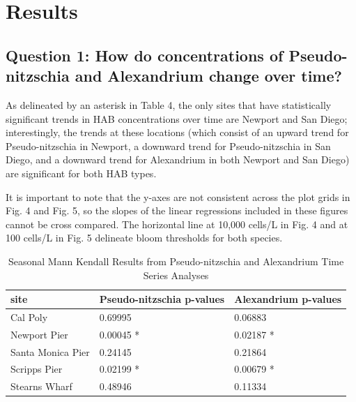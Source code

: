 \documentclass[
  12pt,
]{article}
\begin{document}
\newpage

\hypertarget{results}{%
\section{Results}\label{results}}

\hypertarget{question-1-how-do-concentrations-of-pseudo-nitzschia-and-alexandrium-change-over-time}{%
\subsection{Question 1: How do concentrations of Pseudo-nitzschia and
Alexandrium change over
time?}\label{question-1-how-do-concentrations-of-pseudo-nitzschia-and-alexandrium-change-over-time}}

As delineated by an asterisk in Table 4, the only sites that have
statistically significant trends in HAB concentrations over time are
Newport and San Diego; interestingly, the trends at these locations
(which consist of an upward trend for Pseudo-nitzschia in Newport, a
downward trend for Pseudo-nitzschia in San Diego, and a downward trend
for Alexandrium in both Newport and San Diego) are significant for both
HAB types.

It is important to note that the y-axes are not consistent across the
plot grids in Fig. 4 and Fig. 5, so the slopes of the linear regressions
included in these figures cannot be cross compared. The horizontal line
at 10,000 cells/L in Fig. 4 and at 100 cells/L in Fig. 5 delineate bloom
thresholds for both species.

\begin{longtable}[t]{lll}
\caption{\label{tab:Table 4}Seasonal Mann Kendall Results from Pseudo-nitzschia and Alexandrium Time Series Analyses}\\
\toprule
site & Pseudo-nitzschia p-values & Alexandrium p-values\\
\midrule
Cal Poly & 0.69995 & 0.06883\\
Newport Pier & 0.00045 * & 0.02187 *\\
Santa Monica Pier & 0.24145 & 0.21864\\
Scripps Pier & 0.02199 * & 0.00679 *\\
Stearns Wharf & 0.48946 & 0.11334\\
\bottomrule
\end{longtable}

\newpage
\end{document}
